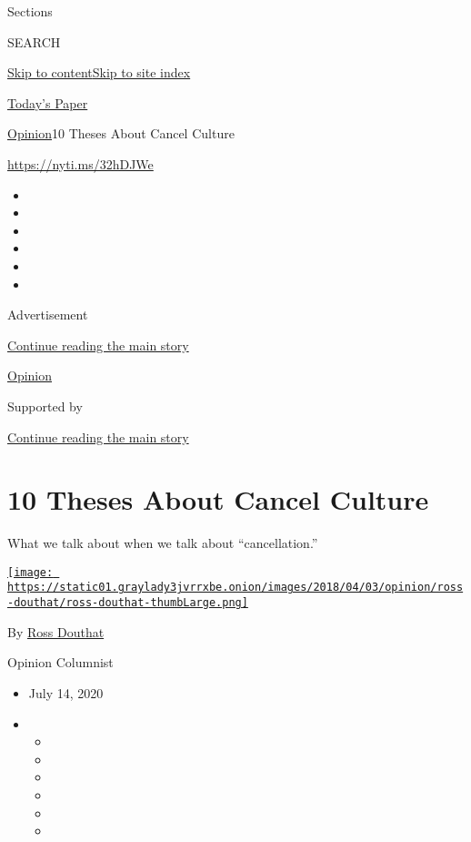 Sections

SEARCH

\protect\hyperlink{site-content}{Skip to
content}\protect\hyperlink{site-index}{Skip to site index}

\href{https://myaccount.nytimes3xbfgragh.onion/auth/login?response_type=cookie\&client_id=vi}{}

\href{https://www.nytimes3xbfgragh.onion/section/todayspaper}{Today's
Paper}

\href{/section/opinion}{Opinion}\textbar{}10 Theses About Cancel Culture

\url{https://nyti.ms/32hDJWe}

\begin{itemize}
\item
\item
\item
\item
\item
\item
\end{itemize}

Advertisement

\protect\hyperlink{after-top}{Continue reading the main story}

\href{/section/opinion}{Opinion}

Supported by

\protect\hyperlink{after-sponsor}{Continue reading the main story}

\hypertarget{10-theses-about-cancel-culture}{%
\section{10 Theses About Cancel
Culture}\label{10-theses-about-cancel-culture}}

What we talk about when we talk about ``cancellation.''

\href{https://www.nytimes3xbfgragh.onion/by/ross-douthat}{\texttt{[image: https://static01.graylady3jvrrxbe.onion/images/2018/04/03/opinion/ross-douthat/ross-douthat-thumbLarge.png]}}

By \href{https://www.nytimes3xbfgragh.onion/by/ross-douthat}{Ross
Douthat}

Opinion Columnist

\begin{itemize}
\item
  July 14, 2020
\item
  \begin{itemize}
  \item
  \item
  \item
  \item
  \item
  \item
  \end{itemize}
\end{itemize}

